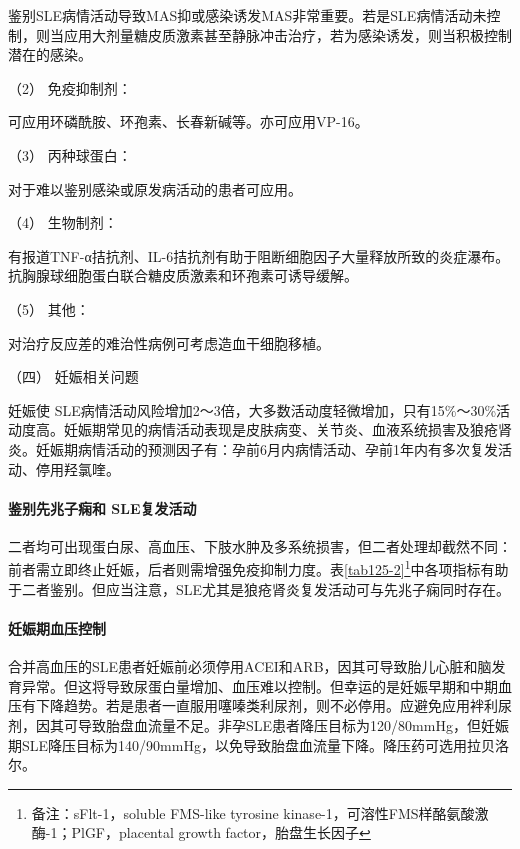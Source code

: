 鉴别SLE病情活动导致MAS抑或感染诱发MAS非常重要。若是SLE病情活动未控制，则当应用大剂量糖皮质激素甚至静脉冲击治疗，若为感染诱发，则当积极控制潜在的感染。

\hypertarget{text00347.htmlux5cux23CHP14-1-3-9-3-2}{}
（2） 免疫抑制剂：

可应用环磷酰胺、环孢素、长春新碱等。亦可应用VP-16。

\hypertarget{text00347.htmlux5cux23CHP14-1-3-9-3-3}{}
（3） 丙种球蛋白：

对于难以鉴别感染或原发病活动的患者可应用。

\hypertarget{text00347.htmlux5cux23CHP14-1-3-9-3-4}{}
（4） 生物制剂：

有报道TNF-α拮抗剂、IL-6拮抗剂有助于阻断细胞因子大量释放所致的炎症瀑布。抗胸腺球细胞蛋白联合糖皮质激素和环孢素可诱导缓解。

\hypertarget{text00347.htmlux5cux23CHP14-1-3-9-3-5}{}
（5） 其他：

对治疗反应差的难治性病例可考虑造血干细胞移植。

\hypertarget{text00347.htmlux5cux23CHP14-1-3-9-4}{}
（四） 妊娠相关问题

妊娠使
SLE病情活动风险增加2～3倍，大多数活动度轻微增加，只有15\%～30\%活动度高。妊娠期常见的病情活动表现是皮肤病变、关节炎、血液系统损害及狼疮肾炎。妊娠期病情活动的预测因子有：孕前6月内病情活动、孕前1年内有多次复发活动、停用羟氯喹。

\paragraph{鉴别先兆子痫和 SLE复发活动}

二者均可出现蛋白尿、高血压、下肢水肿及多系统损害，但二者处理却截然不同：前者需立即终止妊娠，后者则需增强免疫抑制力度。表\ref{tab125-2}\footnote{备注：sFlt-1，soluble FMS-like tyrosine
kinase-1，可溶性FMS样酪氨酸激酶-1；PlGF，placental growth
factor，胎盘生长因子}中各项指标有助于二者鉴别。但应当注意，SLE尤其是狼疮肾炎复发活动可与先兆子痫同时存在。

\paragraph{妊娠期血压控制}

合并高血压的SLE患者妊娠前必须停用ACEI和ARB，因其可导致胎儿心脏和脑发育异常。但这将导致尿蛋白量增加、血压难以控制。但幸运的是妊娠早期和中期血压有下降趋势。若是患者一直服用噻嗪类利尿剂，则不必停用。应避免应用袢利尿剂，因其可导致胎盘血流量不足。非孕SLE患者降压目标为120/80mmHg，但妊娠期SLE降压目标为140/90mmHg，以免导致胎盘血流量下降。降压药可选用拉贝洛尔。

